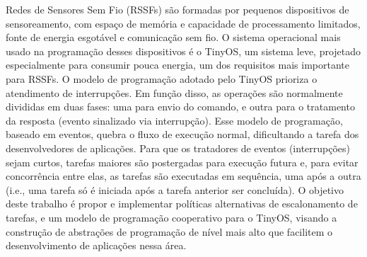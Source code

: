 Redes de Sensores Sem Fio (RSSFs) são formadas por pequenos dispositivos de sensoreamento, com 
espaço de memória e capacidade de processamento limitados, fonte de energia esgotável e comunicação sem fio.
O sistema operacional mais usado na programação desses dispositivos é o TinyOS, um sistema leve, 
projetado especialmente para consumir pouca energia, um dos requisitos mais importante para RSSFs. 
O modelo de programação adotado pelo TinyOS prioriza o atendimento de interrupções.
Em função disso, as operações são normalmente divididas em duas fases: uma para envio
do comando, e outra para o tratamento da resposta (evento sinalizado via interrupção). 
Esse modelo de programação, baseado em eventos, quebra o fluxo de execução normal, dificultando a
tarefa dos desenvolvedores de aplicações. 
Para que os tratadores de eventos (interrupções) sejam curtos, tarefas maiores são
postergadas para execução futura e, para evitar concorrência entre elas,
as tarefas são executadas em sequência, uma após a outra (i.e., uma tarefa só é iniciada após a tarefa
anterior ser concluída).  
O objetivo deste trabalho é propor e implementar políticas alternativas de escalonamento de tarefas, e um modelo de
programação cooperativo para o TinyOS, visando a construção de abstrações de programação de nível mais alto que 
facilitem o desenvolvimento de aplicações nessa área.
